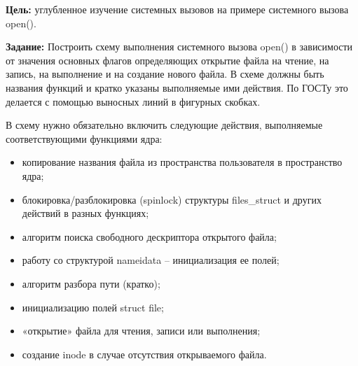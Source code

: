 \Introduction

\textbf{Цель:} углубленное изучение системных вызовов на примере системного вызова open().

\textbf{Задание:}
Построить схему выполнения системного вызова open() в зависимости от значения основных флагов определяющих открытие файла на чтение, на запись, на выполнение и на создание нового файла. В схеме должны быть названия функций и кратко указаны выполняемые ими действия. По ГОСТу это делается с помощью выносных линий в фигурных скобках.

В схему нужно обязательно включить следующие действия, выполняемые соответствующими функциями ядра:
\begin{itemize}
    \item копирование названия файла из пространства пользователя в пространство ядра;

    \item блокировка/разблокировка (spinlock) структуры files\_struct и других действий в разных функциях;

    \item алгоритм поиска свободного дескриптора открытого файла;

    \item работу со структурой nameidata – инициализация ее полей;

    \item алгоритм разбора пути (кратко);

    \item инициализацию полей struct file;

    \item «открытие» файла для чтения, записи или выполнения;

    \item создание inode в случае отсутствия открываемого файла.
\end{itemize}
